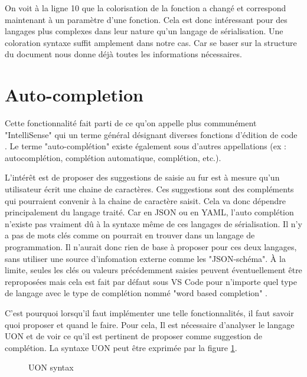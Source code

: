 \documentclass[
    iict, %
    il, %
]{heig-tb}
\begin{document}
On voit à la ligne 10 que la colorisation de la fonction a changé et correspond maintenant à un paramètre d'une fonction.
Cela est donc intéressant pour des langages plus complexes dans leur nature qu'un langage de sérialisation. Une coloration syntaxe suffit amplement dans notre cas.
Car se baser sur la structure du document nous donne déjà toutes les informations nécessaires.

\section{Auto-completion}

Cette fonctionnalité fait parti de ce qu'on appelle plus communément "IntelliSense" qui un terme général désignant diverses fonctions d'édition de code \cite{intelliSense}.
Le terme "auto-complétion" existe également sous d'autres appellations (ex : autocomplétion, complétion automatique, complétion, etc.).

L'intérêt est de proposer des suggestions de saisie au fur est à mesure qu'un utilisateur écrit une chaine de caractères.
Ces suggestions sont des compléments qui pourraient convenir à la chaine de caractère saisit. Cela va donc dépendre principalement du langage traité.
Car en JSON ou en YAML, l'auto complétion n'existe pas vraiment dû à la syntaxe même de ces langages de sérialisation.
Il n'y a pas de mots clés comme on pourrait en trouver dans un langage de programmation.
Il n'aurait donc rien de base à proposer pour ces deux langages, sans utiliser une source d'infomation externe comme les "JSON-schéma".
À la limite, seules les clés ou valeurs précédemment saisies peuvent éventuellement être reproposées mais cela est fait par défaut sous VS Code pour n'importe quel type de langage
avec le type de complétion nommé "word based completion" \cite{word-based-completions}.

C'est pourquoi lorsqu'il faut implémenter une telle fonctionnalités, il faut savoir quoi proposer et quand le faire.
Pour cela, Il est nécessaire d'analyser le langage UON et de voir ce qu'il est pertinent de proposer comme suggestion de complétion.
La syntaxe UON peut être exprimée par la figure \ref{syntax}.

\begin{figure}[!ht]
    \begin{center}
    \end{center}
    \caption[Règle de syntaxe en UON]{\label{syntax} UON syntax}
\end{figure}
\end{document}
